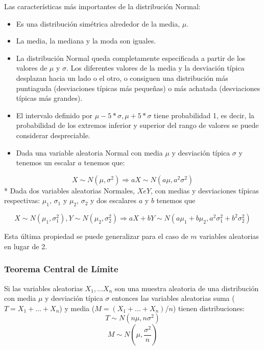 \documentclass[
]{book}
\providecommand{\tightlist}{%
  \setlength{\itemsep}{0pt}\setlength{\parskip}{0pt}}
\begin{document}
Las características más importantes de la distribución Normal:

\begin{itemize}
\tightlist
\item
  Es una distribución simétrica alrededor de la media, \(\mu\).
\item
  La media, la mediana y la moda son iguales.
\item
  La distribución Normal queda completamente especificada a partir de los valores de \(\mu\) y \(\sigma\). Los diferentes valores de la media y la desviación típica desplazan hacia un lado o el otro, o consiguen una distribución más puntiaguda (desviaciones típicas más pequeñas) o más achatada (desviaciones típicas más grandes).
\item
  El intervalo definido por \(\mu - 5 * \sigma, \mu + 5 * \sigma\) tiene probabilidad 1, es decir, la probabilidad de los extremos inferior y superior del rango de valores se puede considerar despreciable.\\
\item
  Dada una variable aleatoria Normal con media \(\mu\) y desviación típica \(\sigma\) y tenemos un escalar \(a\) tenemos que:
\end{itemize}

\[ X \sim N(\mu, \sigma^2) \Longrightarrow aX \sim N(a\mu, a^2\sigma^2)\]
* Dada dos variables aleatorias Normales, \(X e Y\), con medias y desviaciones típicas respectivas: \(\mu_1\), \(\sigma_1\) y \(\mu_2\), \(\sigma_2\) y dos escalares \(a\) y \(b\) tenemos que

\[ X \sim N(\mu_1, \sigma^2_1), Y \sim N(\mu_2, \sigma^2_2) \Longrightarrow aX + bY\sim N(a\mu_1+b\mu_2, a^2\sigma^2_1+b^2\sigma^2_2)\]

Esta última propiedad se puede generalizar para el caso de \(m\) variables aleatorias en lugar de 2.

\hypertarget{teorema-central-de-luxedmite}{%
\subsubsection{Teorema Central de Límite}\label{teorema-central-de-luxedmite}}

Si las variables aleatorias \(X_1,...X_n\) son una muestra aleatoria de una distribución con media \(\mu\) y desviación típica \(\sigma\) entonces las variables aleatorias suma (\(T = X_1+...+X_n\)) y media (\(M = (X_1+...+X_n)/n\)) tienen distribuciones:
\[ T \sim N\left(n\mu,n\sigma^2\right)\]
\[ M \sim N\left(\mu,\frac{\sigma^2}{n}\right)\]
\end{document}
